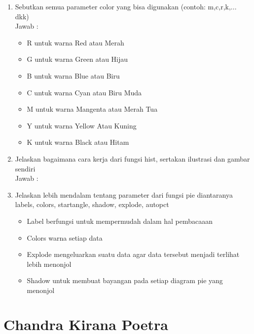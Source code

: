 \begin{enumerate}
\item Sebutkan semua parameter color yang bisa digunakan (contoh: m,c,r,k,... dkk)\\
Jawab :
\begin{itemize}
\item R untuk warna Red atau Merah
\item G untuk warna Green atau Hijau
\item B untuk warna Blue atau Biru
\item C untuk warna Cyan atau Biru Muda
\item M untuk warna Mangenta atau Merah Tua
\item Y untuk warna Yellow Atau Kuning
\item K untuk warna Black atau Hitam
\end{itemize}

\item Jelaskan bagaimana cara kerja dari fungsi hist, sertakan ilustrasi dan gambar sendiri\\
Jawab :


\item Jelaskan lebih mendalam tentang parameter dari fungsi pie diantaranya labels, colors, startangle, shadow, explode, autopct\\
\begin{itemize}
\item Label berfungsi untuk mempermudah dalam hal pembacaaan
\item Colors warna setiap data
\item Explode mengeluarkan suatu data agar data tersebut menjadi terlihat lebih menonjol
\item Shadow untuk membuat bayangan pada setiap diagram pie yang menonjol
\end{itemize}
\end{enumerate}

\section{Chandra Kirana Poetra}
